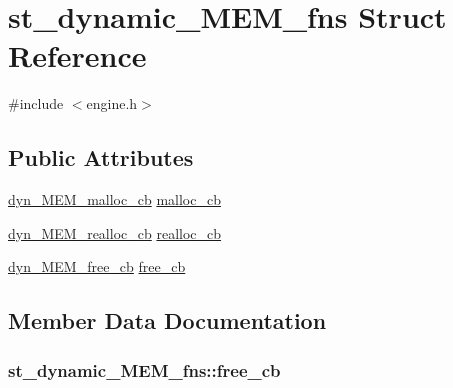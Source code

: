 \hypertarget{structst__dynamic___m_e_m__fns}{}\section{st\+\_\+dynamic\+\_\+\+M\+E\+M\+\_\+fns Struct Reference}
\label{structst__dynamic___m_e_m__fns}


{\ttfamily \#include $<$engine.\+h$>$}

\subsection*{Public Attributes}
\begin{DoxyCompactItemize}
\item 
\hyperlink{engine_8h_a0f1772d9a558bc0a3f57e387bd675b10}{dyn\+\_\+\+M\+E\+M\+\_\+malloc\+\_\+cb} \hyperlink{structst__dynamic___m_e_m__fns_af75222a0702aedaf6a9d1156ef9784ed}{malloc\+\_\+cb}
\item 
\hyperlink{engine_8h_ab77176c11b1114735db82e9c6cb5c4dd}{dyn\+\_\+\+M\+E\+M\+\_\+realloc\+\_\+cb} \hyperlink{structst__dynamic___m_e_m__fns_a40fb5719d28a6c452821f0cb0eca231a}{realloc\+\_\+cb}
\item 
\hyperlink{engine_8h_abb66ea71ef8cabf36213c7abc3bef623}{dyn\+\_\+\+M\+E\+M\+\_\+free\+\_\+cb} \hyperlink{structst__dynamic___m_e_m__fns_aa6b8fe1b3872985cac1a62edacc1e983}{free\+\_\+cb}
\end{DoxyCompactItemize}


\subsection{Member Data Documentation}
\subsubsection[{\texorpdfstring{free\+\_\+cb}{free_cb}}]{ st\+\_\+dynamic\+\_\+\+M\+E\+M\+\_\+fns\+::free\+\_\+cb}\hypertarget{structst__dynamic___m_e_m__fns_aa6b8fe1b3872985cac1a62edacc1e983}{}\label{structst__dynamic___m_e_m__fns_aa6b8fe1b3872985cac1a62edacc1e983}
